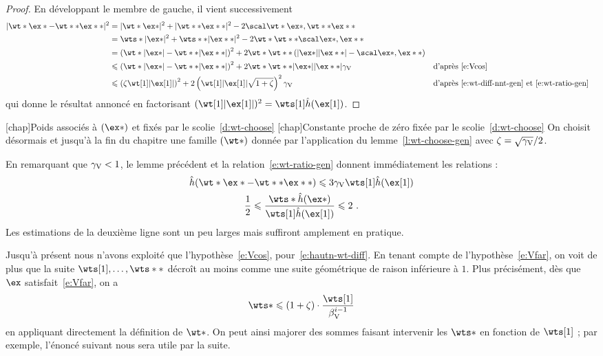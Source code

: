 \begin{proof}
  En développant le membre de gauche, il vient successivement
  \begin{alignat*}{2}
    \nnt{\wt* \ex* - \wt** \ex**}^2
    & =
    \nnt{\wt* \ex*}^2 + \nnt{\wt** \ex**}^2
    - 2 \scalnt{\wt* \ex*}{\wt** \ex**}
    \\
    & = \wts* \nnt{\ex*}^2 + \wts** \nnt{\ex**}^2
    - 2 \wt* \wt** \scalnt{\ex*}{\ex**}
    \\
    & = \left( \wt* \nnt{\ex*} - \wt** \nnt{\ex**} \right)^2
    + 2 \wt* \wt** \left(
      \nnt{\ex*} \nnt{\ex**} - \scalnt{\ex*}{\ex**}
    \right)
    \\
    & \le \left( \wt* \nnt{\ex*} - \wt** \nnt{\ex**} \right)^2
    + 2 \wt* \wt** \nnt{\ex*} \nnt{\ex**} \Vcos
    && \text{d'après~\eqref{e:Vcos}}
    \\
    & \le \left( \zeta \wt[1] \nnt{\ex[1]} \right)^2
    + 2 \left( \wt[1] \nnt{\ex[1]} \sqrt{1 + \zeta} \right)^2 \Vcos
    && \text{d'après~\eqref{e:wt-diff-nnt-gen} et~\eqref{e:wt-ratio-gen}}
  \end{alignat*}
  qui donne le résultat annoncé en factorisant \( (\wt[1] \nnt{\ex[1]})^2 =
      \wts[1] \hautn{\ex[1]} \).
\end{proof}

\begin{nota} \label{n:wt-choose}
  \nomuse[\wt]{(\wt*)}[chap]{Poids associés à \( (\ex*) \) et fixés par le
    scolie~\vref{d:wt-choose}}
  [chap]{Constante proche de zéro fixée par le
    scolie~\vref{d:wt-choose}}
  On choisit désormais et jusqu'à la fin du chapitre une famille \( (\wt*) \)
  donnée par l'application du lemme~\vref{l:wt-choose-gen} avec \( \zeta =
    \sqrt{\gamma \sb{\mathrm{V}}} / 2 \).
\end{nota}

En remarquant que \( \gamma \sb{\mathrm{V}} < 1 \), le lemme précédent et la
relation~\eqref{e:wt-ratio-gen} donnent immédiatement les relations :
\begin{gather} \label{e:hautn-wt-diff}
  \hautn{\wt* \ex* - \wt** \ex**}
  \le
  3 \Vcos \wts[1] \hautn{\ex[1]}
  \\ \label{e:wt-ratio}
  \frac12
  \le
  \frac{ \wts* \hautn{\ex*} }{ \wts[1] \hautn{\ex[1]} }
  \le
  2
  \pmm.
\end{gather}
Les estimations de la deuxième ligne sont un peu larges mais suffiront
amplement en pratique.

Jusqu'à présent nous n'avons exploité que l'hypothèse~\eqref{e:Vcos},
pour~\eqref{e:hautn-wt-diff}. En tenant compte de l'hypothèse~\eqref{e:Vfar}, on
voit de plus que la suite \( \wts[1], \dots, \wts** \) décroît
au moins comme une suite géométrique de raison inférieure à \( 1 \). Plus
précisément, dès que \( \ex \) satisfait~\eqref{e:Vfar}, on a
\begin{equation} \label{e:wt-geom}
  \wts*
  \le
  (1+\zeta) \cdot \frac{\wts[1]}{\Vfar^{\fct-1}}
\end{equation}
en appliquant directement la définition de \( \wt* \). On peut ainsi majorer
des sommes faisant intervenir les \( \wts* \) en fonction de \( \wts[1] \) ;
par exemple, l'énoncé suivant nous sera utile par la suite.

